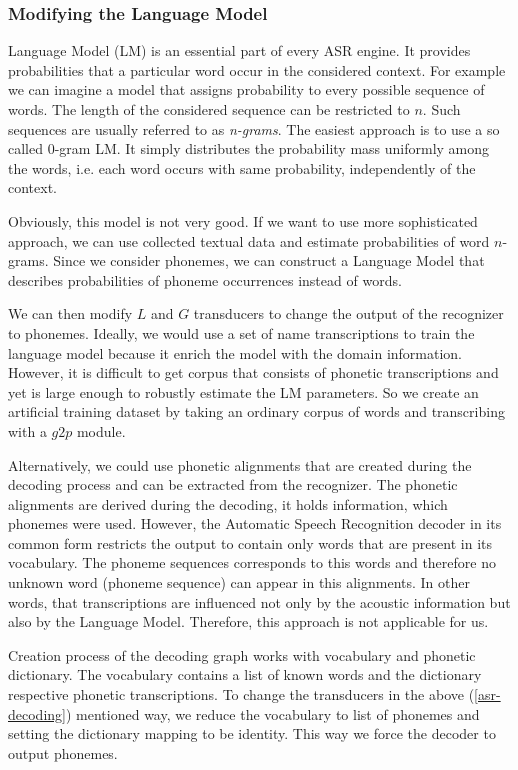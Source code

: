 \subsubsection{Modifying the Language Model}
Language Model (LM) is an essential part of every ASR engine.
It provides probabilities that a particular word occur in the considered context. 
For example we can imagine a model that assigns probability to every possible sequence of words.
The length of the considered sequence can be restricted to $n$.
Such sequences are usually referred to as \textit{n-grams}.
The easiest approach is to use a so called 0-gram LM.
It simply distributes the probability mass uniformly among the words, i.e. each word occurs with same probability, independently of the context.
\par
Obviously, this model is not very good.
If we want to use more sophisticated approach, we can use collected textual data and estimate probabilities of word $n$-grams.
Since we consider phonemes, we can construct a Language Model that describes probabilities of phoneme occurrences instead of words.
\par
We can then modify $L$ and $G$ transducers to change the output of the recognizer to phonemes.
Ideally, we would use a set of name transcriptions to train the language model because it enrich the model with the domain information.
However, it is difficult to get corpus that consists of phonetic transcriptions and yet is large enough to robustly estimate the LM parameters.
So we create an artificial training dataset by taking an ordinary corpus of words and transcribing with a $g2p$ module.
\par
Alternatively, we could use phonetic alignments that are created during the decoding process and can be extracted from the recognizer.
The phonetic alignments are derived during the decoding, it holds information, which phonemes were used.
However, the Automatic Speech Recognition decoder in its common form restricts the output to contain only words that are present in its vocabulary.
The phoneme sequences corresponds to this words and therefore no unknown word (phoneme sequence) can appear in this alignments.
In other words, that transcriptions are influenced not only by the acoustic information but also by the Language Model.
Therefore, this approach is not applicable for us.
\par
Creation process of the decoding graph works with vocabulary and phonetic dictionary.
The vocabulary contains a list of known words and the dictionary respective phonetic transcriptions.
To change the transducers in the above (\ref{asr-decoding}) mentioned way, we reduce the vocabulary to list of phonemes and setting the dictionary mapping to be identity.
This way we force the decoder to output phonemes.
